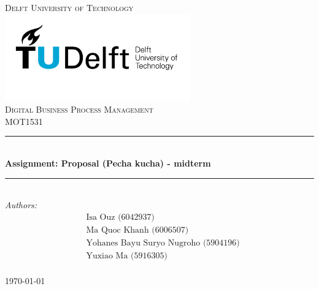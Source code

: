 \documentclass[a4paper]{article}
\begin{document}
\begin{titlepage}

\newcommand{\HRule}{\rule{\linewidth}{0.5mm}} 							%
\center 

\textsc{\LARGE Delft University of Technology}\\[1cm]

\includegraphics[width=0.6\textwidth]{images/TU_delft_logo.jpg}\\[1cm] 	%

\textsc{\Large Digital Business Process Management}\\[0.2cm]
\textsc{\large MOT1531}\\[1cm] 										%
\HRule \\[0.8cm]
{ \huge \bfseries Assignment: Proposal (Pecha kucha) - midterm}\\[0.7cm]								%
\HRule \\[2cm]
\large
\emph{Authors:}\\

\begin{align*}
    &\text{Isa Ouz (6042937)}\\
    &\text{Ma Quoc Khanh (6006507)}\\
    &\text{Yohanes Bayu Suryo Nugroho (5904196)}\\
    &\text{Yuxiao Ma (5916305)}
\end{align*}
\\[1.5cm]													%

{\large \today}\\[5cm]
\vfill 
\end{titlepage}
\end{document}
